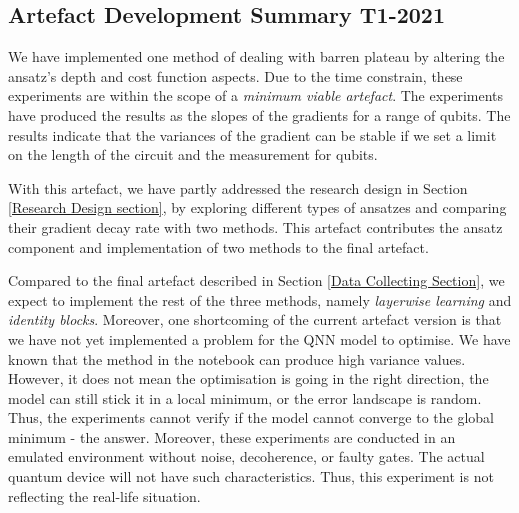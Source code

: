 \subsection{Artefact Development Summary T1-2021}
We have implemented one method of dealing with barren plateau by altering the ansatz's depth and cost function aspects.
Due to the time constrain, these experiments are within the scope of a \textit{minimum viable artefact}.
The experiments have produced the results as the slopes of the gradients for a range of qubits.
The results indicate that the variances of the gradient can be stable if we set a limit on the length of the circuit and the measurement for qubits.

With this artefact, we have partly addressed the research design in Section \ref{Research Design section}, by exploring different types of ansatzes and comparing their gradient decay rate with two methods.
This artefact contributes the ansatz component and implementation of two methods to the final artefact.

Compared to the final artefact described in Section \ref{Data Collecting Section}, we expect to implement the rest of the three methods, namely \textit{layerwise learning} and \textit{identity blocks}.
Moreover, one shortcoming of the current artefact version is that we have not yet implemented a problem for the QNN model to optimise.
We have known that the method in the notebook can produce high variance values. 
However, it does not mean the optimisation is going in the right direction, the model can still stick it in a local minimum, or the error landscape is random. 
Thus, the experiments cannot verify if the model cannot converge to the global minimum - the answer.
Moreover, these experiments are conducted in an emulated environment without noise, decoherence, or faulty gates.
The actual quantum device will not have such characteristics.
Thus, this experiment is not reflecting the real-life situation.